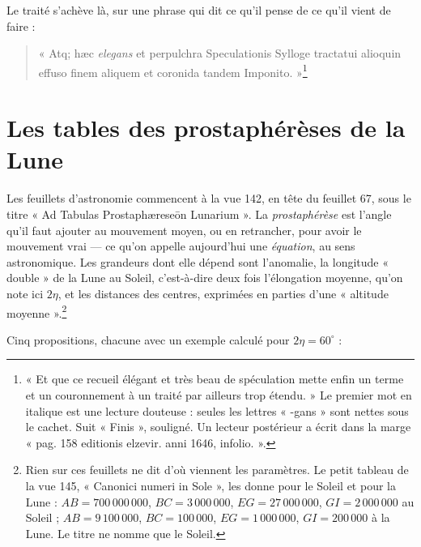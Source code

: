 \documentclass[11pt,a4paper]{article}
\begin{document}
Le traité s'achève là, sur une phrase qui dit ce qu'il pense de ce qu'il vient de
faire :

\begin{quote}
« Atq; hæc \emph{elegans} et perpulchra Speculationis Sylloge tractatui alioquin
effuso finem aliquem et coronida tandem Imponito. »\footnote{« Et que ce recueil
élégant et très beau de spéculation mette enfin un terme et un couronnement à un
traité par ailleurs trop étendu. » Le premier mot en italique est une lecture
douteuse : seules les lettres « -gans » sont nettes sous le cachet. Suit
« Finis », souligné. Un lecteur postérieur a écrit dans la marge « pag. 158
editionis elzevir. anni 1646, infolio. ».}
\end{quote}

\section*{Les tables des prostaphérèses de la Lune}

Les feuillets d'astronomie commencent à la vue 142, en tête du feuillet 67, sous
le titre « Ad Tabulas Prostaphæreseōn Lunarium ». La \emph{prostaphérèse} est
l'angle qu'il faut ajouter au mouvement moyen, ou en retrancher, pour avoir le
mouvement vrai — ce qu'on appelle aujourd'hui une \emph{équation}, au sens
astronomique. Les grandeurs dont elle dépend sont l'anomalie, la longitude
« double » de la Lune au Soleil, c'est-à-dire deux fois l'élongation moyenne,
qu'on note ici $2\eta$, et les distances des centres, exprimées en parties d'une
« altitude moyenne ».\footnote{Rien sur ces feuillets ne dit d'où viennent les
paramètres. Le petit tableau de la vue 145, « Canonici numeri in Sole », les
donne pour le Soleil et pour la Lune : $AB = 700\,000\,000$, $BC = 3\,000\,000$,
$EG = 27\,000\,000$, $GI = 2\,000\,000$ au Soleil ; $AB = 9\,100\,000$,
$BC = 100\,000$, $EG = 1\,000\,000$, $GI = 200\,000$ à la Lune. Le titre ne nomme que
le Soleil.}

Cinq propositions, chacune avec un exemple calculé pour $2\eta = 60^\circ$ :
\end{document}
